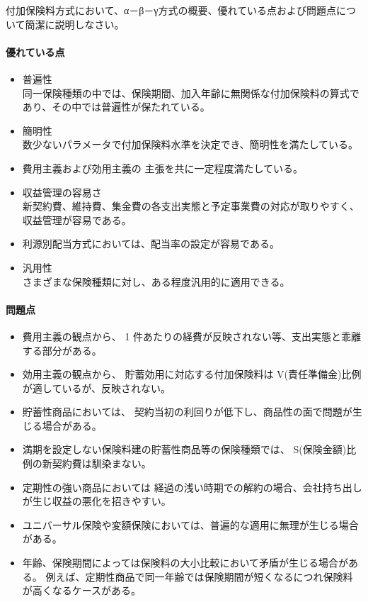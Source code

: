 \documentclass[report,gutter=10mm,fore-edge=10mm,uplatex,dvipdfmx]{jlreq}
\begin{document}

付加保険料方式において、α－β－γ方式の概要、優れている点および問題点について簡潔に説明しなさい。


\paragraph{優れている点}

\begin{itemize}
\tightlist
\item
  普遍性\\
  同一保険種類の中では、保険期間、加入年齢に無関係な付加保険料の算式であり、その中では普遍性が保たれている。
\item
  簡明性\\
  数少ないパラメータで付加保険料水準を決定でき、簡明性を満たしている。
\item
  費用主義および効用主義の
    主張を共に一定程度満たしている。
\item
  収益管理の容易さ\\
  新契約費、維持費、集金費の各支出実態と予定事業費の対応が取りやすく、収益管理が容易である。
\item
  利源別配当方式においては、配当率の設定が容易である。
\item
  汎用性\\ さまざまな保険種類に対し、ある程度汎用的に適用できる。
\end{itemize}

\paragraph{問題点}

\begin{itemize}
\tightlist
\item
  費用主義の観点から、 1  件あたりの経費が反映されない等、支出実態と乖離する部分がある。
\item
  効用主義の観点から、 貯蓄効用に対応する付加保険料は
  V(責任準備金)比例が適しているが、反映されない。
\item
  貯蓄性商品においては、
  契約当初の利回りが低下し、商品性の面で問題が生じる場合がある。
\item
  満期を設定しない保険料建の貯蓄性商品等の保険種類では、
  S(保険金額)比例の新契約費は馴染まない。
\item
  定期性の強い商品においては
  経過の浅い時期での解約の場合、会社持ち出しが生じ収益の悪化を招きやすい。
\item
  ユニバーサル保険や変額保険においては、普遍的な適用に無理が生じる場合がある。
\item
  年齢、保険期間によっては保険料の大小比較において矛盾が生じる場合がある。
  例えば、定期性商品で同一年齢では保険期間が短くなるにつれ保険料が高くなるケースがある。
\end{itemize}
\end{document}
